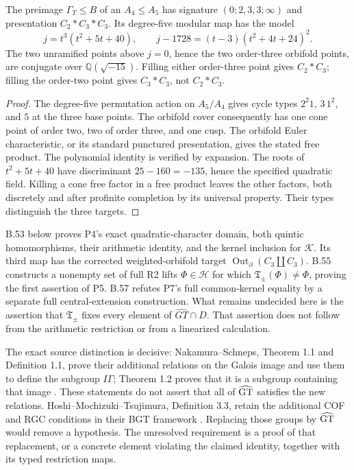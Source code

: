 The preimage \(\Gamma_T\leq B\) of an \(A_4\leq A_5\) has
signature \((0;2,3,3;\infty)\) and presentation
\(C_2*C_3*C_3\). Its degree-five modular map has the model
\[
 j=t^3(t^2+5t+40),\qquad
 j-1728=(t-3)(t^2+4t+24)^2.
\]
The two unramified points above \(j=0\), hence the two order-three
orbifold points, are conjugate over \(\mathbb Q(\sqrt{-15})\).
Filling either order-three point gives \(C_2*C_3\); filling the
order-two point gives \(C_3*C_3\), not \(C_2*C_3\).
\begin{proof}
The degree-five permutation action on \(A_5/A_4\) gives cycle
types \(2^2 1\), \(3\,1^2\), and \(5\) at the three base
points. The orbifold cover consequently has one cone point of
order two, two of order three, and one cusp. The orbifold Euler
characteristic, or its standard punctured presentation, gives the
stated free product. The polynomial identity is verified by
expansion. The roots of \(t^2+5t+40\) have discriminant
\(25-160=-135\), hence the specified quadratic field.
Killing a cone free factor in a free product leaves the other
factors, both discretely and after profinite completion by its
universal property. Their types distinguish the three targets.
\end{proof}

B.53 below proves P4's exact quadratic-character domain, both
quintic homomorphisms, their arithmetic identity, and the kernel
inclusion for $\mathcal K$. Its third map has the corrected
weighted-orbifold target $\operatorname{Out}_{\partial}(C_3\amalg C_3)$.
B.55 constructs a nonempty set of full R2 lifts $\Phi\in\mathcal H$
for which $\mathfrak T_\pm(\Phi)\ne\Phi$, proving the first
assertion of P5. B.57 refutes P7's full common-kernel equality
by a separate full central-extension construction.
What remains undecided here is the assertion that
$\mathfrak T_\pm$ fixes every element of $\widehat{GT}\cap D$.
That assertion does not follow from the arithmetic restriction
or from a linearized calculation.

The exact source distinction is decisive: Nakamura--Schneps,
Theorem 1.1 and Definition 1.1, prove their additional relations
on the Galois image and use them to define the subgroup
\(I\Gamma\); Theorem 1.2 proves that it is a subgroup containing
that image \citep{NakamuraSchneps2000}. These statements do not
assert that all of \(\widehat{\mathrm{GT}}\) satisfies the new relations.
Hoshi--Mochizuki--Tsujimura, Definition 3.3, retain the additional
COF and RGC conditions in their BGT framework
\citep{HoshiMochizukiTsujimura2025}. Replacing those groups by
\(\widehat{\mathrm{GT}}\) would remove a hypothesis. The unresolved requirement
is a proof of that replacement, or a concrete element violating
the claimed identity, together with its typed restriction maps.

